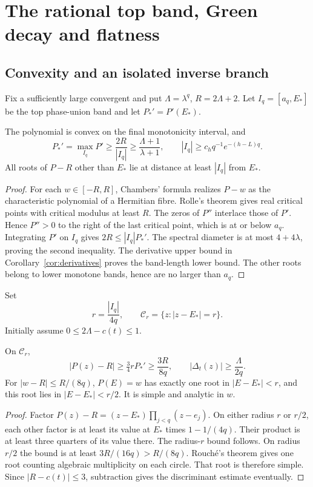 \section{The rational top band, Green decay and flatness}\label{app:top}
\subsection{Convexity and an isolated inverse branch}
Fix a sufficiently large convergent and put $\Lambda=\lambda^q$, $R=2\Lambda+2$. Let $I_q=[a_q,E_*]$ be the top phase-union band and let $P_*'=P'(E_*)$.

\begin{lemma}\label{lem:convex}
The polynomial is convex on the final monotonicity interval, and
\begin{equation}\label{eq:topbounds}
 P_*'=\max_{I_q}P'\ge\frac{2R}{|I_q|}
       \ge\frac{\Lambda+1}{\lambda+1},\qquad
 |I_q|\ge c_hq^{-1}e^{-(h-L)q}.
\end{equation}
All roots of $P-R$ other than $E_*$ lie at distance at least $|I_q|$ from $E_*$.
\end{lemma}
\begin{proof}
For each $w\in[-R,R]$, Chambers' formula realizes $P-w$ as the characteristic polynomial of a Hermitian fibre. Rolle's theorem gives real critical points with critical modulus at least $R$. The zeros of $P''$ interlace those of $P'$. Hence $P''>0$ to the right of the last critical point, which is at or below $a_q$. Integrating $P'$ on $I_q$ gives $2R\le |I_q|P_*'$. The spectral diameter is at most $4+4\lambda$, proving the second inequality. The derivative upper bound in Corollary~\ref{cor:derivatives} proves the band-length lower bound. The other roots belong to lower monotone bands, hence are no larger than $a_q$.
\end{proof}

Set
\begin{equation}\label{eq:contour}
 r=\frac{|I_q|}{4q},\qquad \mathcal C_r=\{z:|z-E_*|=r\}.
\end{equation}
Initially assume $0\le2\Lambda-c(t)\le1$.

\begin{lemma}\label{lem:contour}
On $\mathcal C_r$,
\[
 |P(z)-R|\ge\tfrac34rP_*'\ge\frac{3R}{8q},\qquad
 |\Delta_t(z)|\ge\frac{\Lambda}{2q}.
\]
For $|w-R|\le R/(8q)$, $P(E)=w$ has exactly one root in $|E-E_*|<r$, and this root lies in $|E-E_*|<r/2$. It is simple and analytic in $w$.
\end{lemma}
\begin{proof}
Factor $P(z)-R=(z-E_*)\prod_{j<q}(z-e_j)$. On either radius $r$ or $r/2$, each other factor is at least its value at $E_*$ times $1-1/(4q)$. Their product is at least three quarters of its value there. The radius-$r$ bound follows. On radius $r/2$ the bound is at least $3R/(16q)>R/(8q)$. Rouch\'e's theorem gives one root counting algebraic multiplicity on each circle. That root is therefore simple. Since $|R-c(t)|\le3$, subtraction gives the discriminant estimate eventually.
\end{proof}

